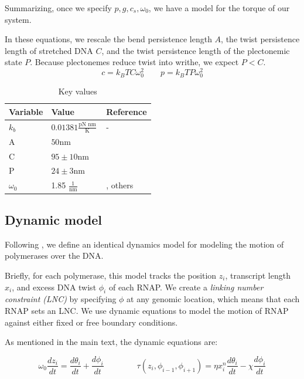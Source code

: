 \documentclass[11pt]{article}
\newcommand{\units}[2]{\frac{\text{#1}}{\text{#2}}\,}
\begin{document}
Summarizing, once we specify \(p, g, c_s, \omega_0\), we have a model for the torque of our system. 

In these equations, we rescale
the bend persistence length \(A\), the twist persistence length of stretched DNA \(C\), and the twist persistence length of the plectonemic
state \(P\). Because plectonemes reduce twist into writhe, we expect \(P < C\).
\[c = k_B T C \omega_0^2 \qquad p = k_B T P \omega_0^2\]

\begin{table}[h]
    \centering
    \begin{tabular}{@{}lll@{}}
        \toprule
        Variable & Value & Reference \\
        \midrule
        \(k_b\) & \(0.01381 \units{pN nm}{K}\) & - \\
        \midrule
        A & \(50\)nm & \parencite{markoTorqueDynamicsLinking2007} \\
        C & \(95 \pm 10\)nm & \parencite{markoTorqueDynamicsLinking2007} \\
        P & \(24 \pm 3\)nm & \parencite{markoTorqueDynamicsLinking2007} \\
        \(\omega_0\) & 1.85 \(\units{1}{nm}\) & \parencite{sevierPropertiesGeneExpression2018}, others \\
        \bottomrule
    \end{tabular}
    \caption{Key values}
    \label{tab:constants}
\end{table}


\subsection{Dynamic model}
Following \textcite{sevierPropertiesGeneExpression2018}, we define an identical dynamics model for modeling the motion of polymerases over the DNA.

Briefly, for each polymerase, this model tracks the position \(z_i\), transcript length \(x_i\), and excess DNA twist \(\phi_i\) of each RNAP. We create a \emph{linking number constraint (LNC)} by specifying \(\phi\) at any genomic location, which means that each RNAP sets an LNC. We use dynamic equations to model the motion of RNAP against either fixed or free boundary conditions.

As mentioned in the main text, the dynamic equations are:

\begin{equation}
    \omega_0 \frac{d z_i}{dt} = \frac{d \theta_i}{dt} + \frac{d \phi_i}{dt} \qquad \qquad \tau(z_i, \phi_{i-1}, \phi_{i+1}) = \eta x_i^n \frac{d\theta_i}{dt} - \chi \frac{d\phi_i}{dt}
\end{equation}
\end{document}
